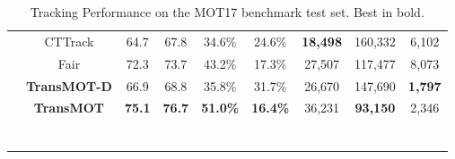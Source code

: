 \documentclass[10pt,twocolumn,letterpaper]{article}
\makeatletter
\newcommand{\thickhline}{\noalign {\ifnum 0=`}\fi \hrule height 1pt
    \futurelet \reserved@a \@xhline
}
\makeatother
\begin{document}
\begin{table}
\begin{center}
\begin{tabular}{@{\hskip 0.2mm}c@{\hskip 0.5mm}|@{\hskip 0.1mm}c@{\hskip 0.1mm}c@{\hskip 1.5mm}c@{\hskip 0.1mm}c@{\hskip 1.5mm}c@{\hskip 1.5mm}c@{\hskip 1.5mm}c@{\hskip 1.5mm}c@{\hskip 1.5mm}}
			&CTTrack \cite{zhou2020tracking}& 64.7 & 67.8& 34.6\%& 24.6\%& \textbf{18,498}& 160,332 &6,102\\
			
			&Fair \cite{zhang2020fairmot}& 72.3& 73.7& 43.2\%& 17.3\%& 27,507 &117,477& 8,073\\
			


			\cline{2-9}
			&\textbf{TransMOT-D} & 66.9 & 68.8 &35.8\% & 31.7\% &	26,670 &147,690 & \textbf{1,797}\\
			& \textbf{TransMOT} &\textbf{75.1}&\textbf{76.7}&\textbf{51.0\%} & \textbf{16.4\%} &36,231 &\textbf{93,150} &2,346\\
			\hline\thickhline
		\end{tabular}

	\end{center}
		\vspace{-2mm}
	\caption{Tracking Performance on the MOT17 benchmark test set. Best in bold.}
    \label{table:res17}

\end{table}
\end{document}
